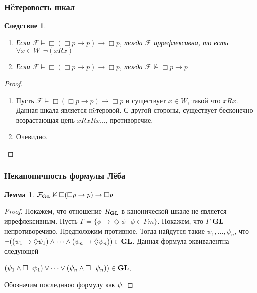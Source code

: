 \documentclass[pdf,utf8,russian,aspectratio=169]{beamer}
\newtheorem{lem}{Лемма}
\newtheorem{col}{Следствие}
\begin{document}
\begin{frame}
  \frametitle{Н\"{e}теровость шкал}
  \begin{col}
    \begin{enumerate}

    \item Если $\mathcal{F} \models \Box (\Box p \to p) \to \Box p$, тогда $\mathcal{F}$ иррефлексивна, то есть $\forall x \in W \:\: \neg (x R x)$

    \item Если $\mathcal{F} \models \Box (\Box p \to p) \to \Box p$, тогда $\mathcal{F} \nvDash \Box p \to p$
  \end{enumerate}
  \end{col}

  \begin{proof}
    \begin{enumerate}
    \item Пусть $\mathcal{F} \models \Box (\Box p \to p) \to \Box p$ и существует $x \in W$, такой что $x R x$.
    Данная шкала является н\"{e}теровой.
    С другой стороны, существует бесконечно возрастающая цепь $x R x R x \dots$, противоречие.
    \item Очевидно.
  \end{enumerate}
  \end{proof}
\end{frame}

\begin{frame}
  \frametitle{Неканоничность формулы Л\"{е}ба}

  \begin{lem}
    $\mathcal{F}_{\bf GL} \nvDash \Box (\Box p \to p) \to \Box p$
  \end{lem}

  \begin{proof}
    Покажем, что отношение $R_{\bf GL}$ в канонической шкале не является иррефлексивным. Пусть $\Gamma = \{ \phi \to \Diamond \phi \: | \: \phi \in Fm \}$. Покажем, что $\Gamma$ ${\bf GL}$-
    непротиворечиво. Предположим противное. Тогда найдутся такие $\psi_1, \dots, \psi_n$, что
    $\neg ((\psi_1 \to \Diamond \psi_1) \land \dots \land (\psi_n \to \Diamond \psi_n)) \in {\bf GL}$.
    Данная формула эквивалентна следующей
    \begin{center}
    $ (\psi_1 \land \Box \neg \psi_1) \lor \dots \lor (\psi_n \land \Box \neg \psi_n)) \in {\bf GL}$.
    \end{center}
    Обозначим последнюю формулу как $\psi$.

  \end{proof}
\end{frame}
\end{document}
